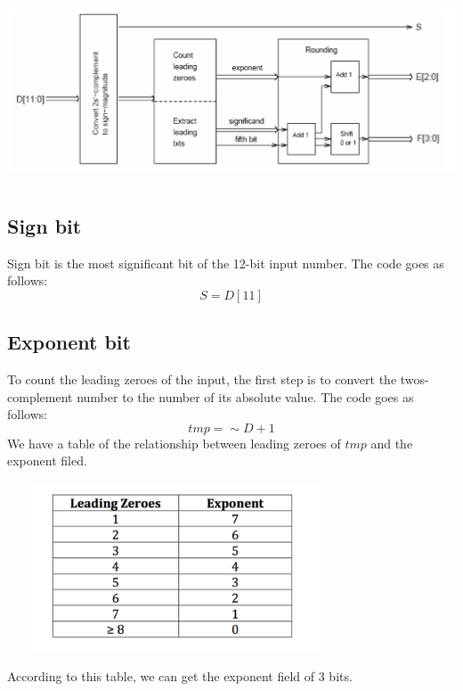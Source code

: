 \begin{minipage}{\linewidth}
            \centering
            \includegraphics[width=15cm, height=5.5cm]{design.png}
            \label{fig:figure2}
        \end{minipage}

\subsection*{Sign bit}
Sign bit is the most significant bit of the 12-bit input number.
The code goes as follows:
$$S = D[11]$$

\subsection*{Exponent bit}
To count the leading zeroes of the input, the first step is to convert the twos-complement number to the number of its absolute value. The code goes as follows:
$$tmp = \sim D + 1$$
We have a table of the relationship between leading zeroes of $tmp$ and the exponent filed. \\
\begin{minipage}{\linewidth}
            \centering
            \includegraphics[width=10cm, height=5cm]{lead_zerotable.png}
        \end{minipage}
According to this table, we can get the exponent field of 3 bits. 

